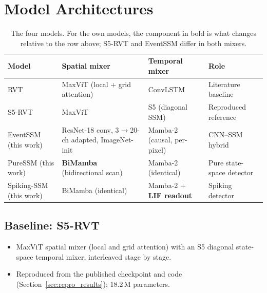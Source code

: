 \documentclass[11pt, a4paper]{report}
\begin{document}
\section{Model Architectures}
\begin{table}[htbp]
\centering
\caption{The four models. For the own models, the component in bold is what changes relative to the row
above; S5-RVT and EventSSM differ in both mixers.}
\label{tab:four_models}
\begin{tabularx}{\textwidth}{@{}lXXX@{}}
\toprule
\textbf{Model} & \textbf{Spatial mixer} & \textbf{Temporal mixer} & \textbf{Role} \\
\midrule
RVT & MaxViT (local + grid attention) & ConvLSTM & Literature baseline \\
S5-RVT & MaxViT & S5 (diagonal SSM) & Reproduced reference \\
EventSSM (this work) & ResNet-18 conv, 3$\to$20-ch adapted, ImageNet-init & Mamba-2 (causal, per-pixel) & CNN--SSM hybrid \\
PureSSM (this work) & \textbf{BiMamba} (bidirectional scan) & Mamba-2 (identical) & Pure state-space detector \\
Spiking-SSM (this work) & BiMamba (identical) & Mamba-2 $+$ \textbf{LIF readout} & Spiking detector \\
\bottomrule
\end{tabularx}
\end{table}

\subsection{Baseline: S5-RVT}
\begin{itemize}
  \item MaxViT spatial mixer (local and grid attention) with an S5 diagonal state-space temporal mixer, interleaved stage by stage.
  \item Reproduced from the published checkpoint and code (Section~\ref{sec:repro_results}); 18.2\,M parameters.
\end{itemize}
\end{document}

